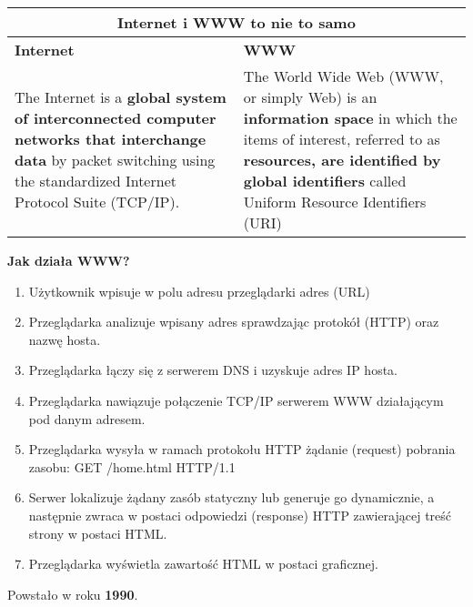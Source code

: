 \documentclass[../main.tex]{subfiles}
\begin{document}
    \begin{table}[H]
        \begin{center}
            \begin{tabular}{|p{8cm}|p{8cm}|}
                \hline
                \multicolumn{2}{|c|}{\textbf{Internet i WWW to nie to samo}}\\
                \hline
                \textbf{Internet} & \textbf{WWW}\\
                \hline
                \hline
                The Internet is a \textbf{global system of interconnected computer networks that interchange data} by
                packet switching using the standardized Internet Protocol Suite (TCP/IP).
                &
                The World Wide Web (WWW, or simply Web) is an \textbf{information space} in which the items of interest,
                referred to as \textbf{resources, are identified by global identifiers} called Uniform Resource
                Identifiers (URI)\\
                \hline
            \end{tabular}
        \end{center}
    \end{table}

    \textbf{Jak działa WWW?}
    \begin{enumerate}
        \item Użytkownik wpisuje w polu adresu przeglądarki adres (URL)
        \item Przeglądarka analizuje wpisany adres sprawdzając protokół (HTTP) oraz nazwę hosta.
        \item Przeglądarka łączy się z serwerem DNS i uzyskuje adres IP hosta.
        \item Przeglądarka nawiązuje połączenie TCP/IP serwerem WWW działającym pod danym adresem.
        \item Przeglądarka wysyła w ramach protokołu HTTP żądanie (request) pobrania zasobu: GET /home.html HTTP/1.1
        \item Serwer lokalizuje żądany zasób statyczny lub generuje go dynamicznie, a następnie zwraca w postaci odpowiedzi (response) HTTP zawierającej treść strony w postaci HTML.
        \item Przeglądarka wyświetla zawartość HTML w postaci graficznej.
    \end{enumerate}

    Powstało w roku \textbf{1990}.
\end{document}
